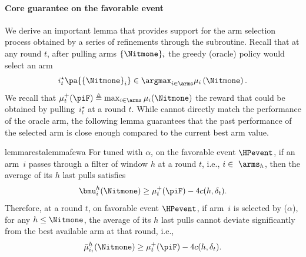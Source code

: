 \paragraph{Core guarantee on the favorable event} 
We derive an important lemma that provides support for the arm selection process obtained by a series of refinements through the \FILTER subroutine. Recall that at any round $t$, after pulling arms $\{ \Nitmone\}_i$ the greedy (oracle) policy would select an arm 
%
\begin{align*}
i^\star_t \pa{\left\{ \Nitmone \right\}_i}  \in  \argmax_{i \in \arms} \mu_i \left( \Nitmone\right).
\end{align*}
%
We recall that $\mu^+_t(\piF) \triangleq \max_{i \in \arms} \mu_i (\Nitmone)$ the reward that could be obtained by pulling~$i^\star_t$ at a round $t$. 
While \FEWA cannot directly match the performance of the oracle arm, the following lemma guarantees that the past performance of the selected arm is close enough compared to the current best arm value. 

\begin{restatable}{lemma}{restalemmafewa}
\label{lem:core-FEWA}
For {\FEWA} tuned with $\alpha$, on the favorable event $\HPevent$, if an arm~$i$ passes through a filter of window $h$ at a round $t$, i.e., $i\in\ \arms_h$, then the average of its $h$ last pulls satisfies
%
\begin{equation}\label{eq:fundamental-eq-FEWA}
\bmu^{h}_i(\Nitmone ) \geq  \mu^+_t(\piF) - 4 c(h, \delta_t).
\end{equation}
Therefore, at a round $t$, on favorable event $\HPevent$, if arm~$i$ is selected by {\FEWA($\alpha$)}, for any $h \leq \Nitmone$,  the average of its $h$ last pulls cannot deviate significantly from the best available arm at that round, i.e.,
%
\begin{equation*}
\bar{\mu}^{h}_{i_{t}}(\Nitmone) \geq \mu^+_t(\piF) - 4 c(h, \delta_{t}).
\end{equation*}
\end{restatable}

